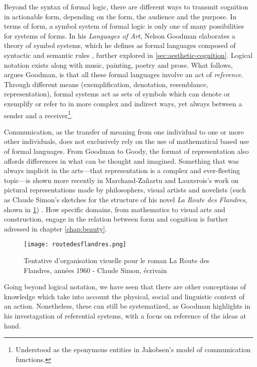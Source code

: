 Beyond the syntax of formal logic, there are different ways to transmit cognition in actionable form, depending on the form, the audience and the purpose. In terms of form, a symbol system of formal logic is only one of many possibilities for systems of forms. In his \emph{Languages of Art}, Nelson Goodman elaborates a theory of symbol systems, which he defines as formal languages composed of syntactic and semantic rules \citep{goodman_languages_1976}, further explored in \ref{sec:aesthetic-cognition}. Logical notation exists along with music, painting, poetry and prose. What follows, argues Goodman, is that all these formal languages involve an act of \emph{reference}. Through different means (exemplification, denotation, resemblance, representation), formal systems act as sets of symbols which can denote or exemplify or refer to in more complex and indirect ways, yet always between a sender and a receiver\footnote{Understood as the eponymous entities  in Jakobsen's model of communication functions.}.

Communication, as the transfer of meaning from one individual to one or more other individuals, does not exclusively rely on the use of mathematical based use of formal languages. From Goodman to Goody, the format of representation also affords differences in what can be thought and imagined. Something that was always implicit in the arts—that representation is a complex and ever-fleeting topic—is shown more recently in Marchand-Zañartu and Lauxerois's work on pictural representations made by philosophers, visual artists and novelists (such as Claude Simon's sketches for the structure of his novel \emph{La Route des Flandres}, shown in \ref{graphic:routedesflandres}) \citep{marchand-zanartu_32_2022}. How specific domains, from mathematics to visual arts and construction, engage in the relation between form and cognition is further adressed in chapter \ref{chap:beauty}.

\begin{figure}
    \texttt{[image: routedesflandres.png]}
    \caption{Tentative d'organisation visuelle pour le roman La Route des Flandres, années 1960 - Claude Simon, écrivain}
    \label{graphic:routedesflandres}
\end{figure}

Going beyond logical notation, we have seen that there are other conceptions of knowledge which take into account the physical, social and linguistic context of an action. Nonetheless, these can still be systematized, as Goodman highlights in his investagation of referential systems, with a focus on reference of the ideas at hand.

